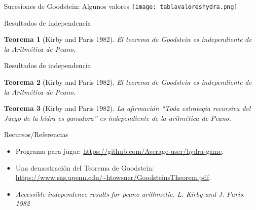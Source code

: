 \documentclass[10pt]{beamer}
\newtheorem{teo}{Teorema}[section]
\begin{document}
\begin{frame}{Sucesiones de Goodstein: Algunos valores}
  \texttt{[image: tablavaloreshydra.png]}
\end{frame}

\begin{frame}{Resultados de independencia}
  \begin{teo}[Kirby and Paris 1982]
    El teorema de Goodstein es independiente de la Aritmética de Peano.
  \end{teo}
\end{frame}

\begin{frame}{Resultados de independencia}
  \begin{teo}[Kirby and Paris 1982]
    El teorema de Goodstein es independiente de la Aritmética de Peano.
  \end{teo}
  \begin{teo}[Kirby and Paris 1982]
    La afirmación ``Toda estrategia recursiva del Juego de la hidra es ganadora'' es
    independiente de la aritmética de Peano.
  \end{teo}
\end{frame}



\begin{frame}{Recursos/Referencias}
  \begin{itemize}
  \item {\small Programa para jugar:} {\scriptsize \url{https://github.com/Average-user/hydra-game}}.
  \item {\small Una demostración del Teorema de Goodstein:} {\scriptsize \url{https://www.sas.upenn.edu/~htowsner/GoodsteinsTheorem.pdf}}.
  \item {\small {\em Accessible independence results for peano arithmetic. L. Kirby and J. Paris. 1982}}
  \end{itemize}
\end{frame}
\end{document}
